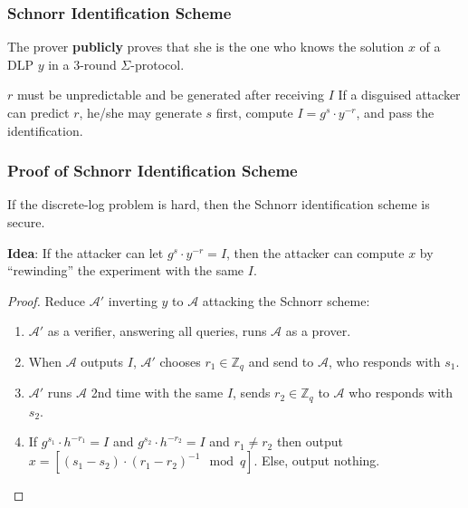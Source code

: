 \begin{frame}\frametitle{Schnorr Identification Scheme}
The prover \textbf{publicly} proves that she is the one who knows 
the solution $x$ of a DLP $y$ in a 3-round $\Sigma$-protocol. 
\begin{figure}
\begin{center}

\end{center}
\end{figure} 
\begin{exampleblock}{$r$ must be unpredictable and be generated after receiving $I$}
If a disguised attacker can predict $r$, he/she may generate $s$ first, compute $I = g^s \cdot y^{-r}$, and pass the identification. 
\end{exampleblock}
\end{frame}

\begin{frame}\frametitle{Proof of Schnorr Identification Scheme}
	\begin{theorem}
		If the discrete-log problem is hard, then the Schnorr identification scheme is secure.
	\end{theorem}
\textbf{Idea}: If the attacker can let $g^s \cdot y^{-r} = I$, then the attacker can compute $x$ by ``rewinding'' the experiment with the same $I$.
\begin{proof}
Reduce $\mathcal{A}'$ inverting $y$ to $\mathcal{A}$ attacking the Schnorr scheme:
\begin{enumerate}
\item $\mathcal{A}'$ as a verifier, answering all queries, runs $\mathcal{A}$ as a prover.
\item When $\mathcal{A}$ outputs $I$, $\mathcal{A}'$ chooses $r_1 \in \mathbb{Z}_q$ and send to $\mathcal{A}$, who responds with $s_1$.
\item $\mathcal{A}'$ runs $\mathcal{A}$ 2nd time with the same $I$, sends $r_2 \in \mathbb{Z}_q$ to  $\mathcal{A}$ who responds with $s_2$. 
\item If $g^{s_1} \cdot h^{-r_1} = I$ and $g^{s_2} \cdot h^{-r_2} = I$ and $r_1 \neq r_2$ then output $x = [ (s_1 - s_2)\cdot (r_1 - r_2)^{-1} \mod q]$. Else, output nothing.
\end{enumerate}
\end{proof}
\end{frame}

